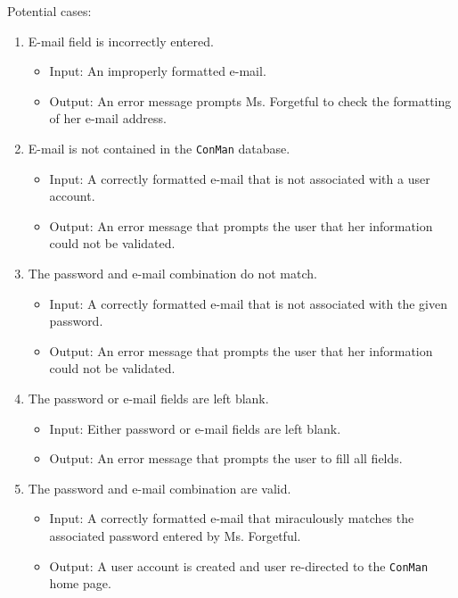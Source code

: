 \documentclass{article}
\begin{document}
Potential cases:
\begin{enumerate}
    \item E-mail field is incorrectly entered.
        \begin{itemize}
            \item Input: An improperly formatted e-mail.
            \item Output: An error message prompts Ms. Forgetful to check the formatting of her e-mail address.
        \end{itemize}
    \item E-mail is not contained in the \texttt{ConMan} database.
        \begin{itemize}
            \item Input: A correctly formatted e-mail that is not associated with a user account.
            \item Output: An error message that prompts the user that her information could not be validated.
        \end{itemize}
    \item The password and e-mail combination do not match.
        \begin{itemize}
            \item Input: A correctly formatted e-mail that is not associated with the given password.
            \item Output: An error message that prompts the user that her information could not be validated.
        \end{itemize}
    \item The password or e-mail fields are left blank.
        \begin{itemize}
            \item Input: Either password or e-mail fields are left blank.
            \item Output: An error message that prompts the user to fill all fields.
        \end{itemize}
    \item The password and e-mail combination are valid.
        \begin{itemize}
            \item Input: A correctly formatted e-mail that miraculously matches the associated password entered by Ms. Forgetful.
            \item Output: A user account is created and user re-directed to the \texttt{ConMan} home page.
        \end{itemize}
\end{enumerate}
\end{document}

